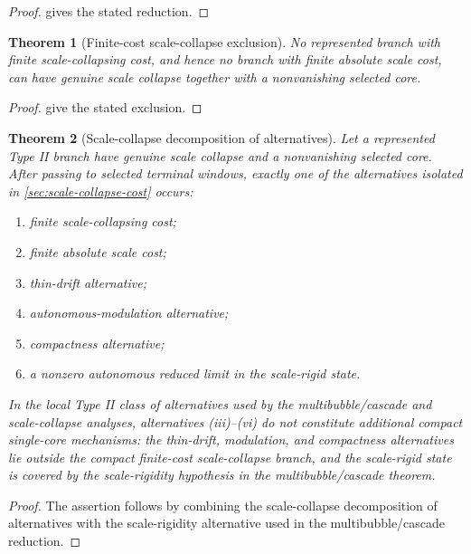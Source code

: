 \documentclass[11pt]{amsart}
\theoremstyle{plain}
\newtheorem{theorem}{Theorem}[section]
\theoremstyle{definition}
\theoremstyle{remark}
\begin{document}
\begin{proof}
 gives the stated reduction.
\end{proof}

\begin{theorem}[Finite-cost scale-collapse exclusion]
\label{paper6:thm:scale-cost}
No represented branch with finite scale-collapsing cost, and hence no branch
with finite absolute scale cost, can have genuine scale collapse together with a
nonvanishing selected core.
\end{theorem}

\begin{proof}
 give the stated exclusion.
\end{proof}

\begin{theorem}[Scale-collapse decomposition of alternatives]
\label{paper6:thm:scale-stratification}
Let a represented Type II branch have genuine scale collapse and a nonvanishing
selected core.  After passing to selected terminal windows, exactly one of the
alternatives isolated in \cref{sec:scale-collapse-cost} occurs:
\begin{enumerate}[label=\textup{(\roman*)}]
\item finite scale-collapsing cost;
\item finite absolute scale cost;
\item thin-drift alternative;
\item autonomous-modulation alternative;
\item compactness alternative;
\item a nonzero autonomous reduced limit in the scale-rigid state.
\end{enumerate}
In the local Type II class of alternatives used by the multibubble/cascade and
scale-collapse analyses, alternatives
\textup{(iii)}--\textup{(vi)} do not constitute additional compact single-core
mechanisms: the thin-drift, modulation, and compactness alternatives lie outside
the compact finite-cost scale-collapse branch, and the scale-rigid state is
covered by the scale-rigidity hypothesis in the multibubble/cascade theorem.
\end{theorem}

\begin{proof}
The assertion follows by combining the scale-collapse decomposition of
alternatives with the scale-rigidity alternative used in the
multibubble/cascade reduction.
\end{proof}
\end{document}
